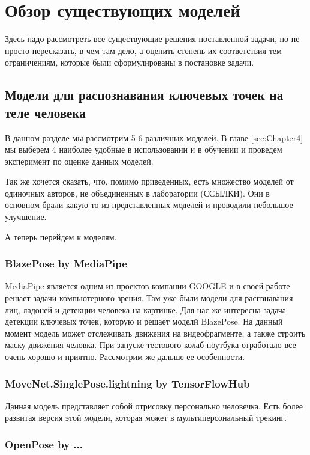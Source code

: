 \section{Обзор существующих моделей}
\label{sec:Chapter2} 
Здесь надо рассмотреть все существующие решения поставленной задачи, но не просто пересказать, в чем там дело, а оценить степень их соответствия тем ограничениям, которые были сформулированы в постановке задачи.


\subsection{Модели для распознавания ключевых точек на теле человека}

В данном разделе мы рассмотрим 5-6 различных моделей. В главе \ref{sec:Chapter4} мы выберем 4 наиболее удобные в использовании и в обучении и проведем эксперимент по оценке данных моделей.

Так же хочется сказать, что, помимо приведенных, есть множество моделей от одиночных авторов, не объединенных в лаборатории (ССЫЛКИ). Они в основном брали какую-то из представленных моделей и проводили небольшое улучшение.

А теперь перейдем к моделям.

\subsubsection{BlazePose by MediaPipe}

MediaPipe является одним из проектов компании GOOGLE и в своей работе решает задачи компьютерного зрения. Там уже были модели для распзнавания лиц, ладоней и детекции человека на картинке. Для нас же интересна задача детекции ключевых точек, которую и решает моделй BlazePose. На данный момент модель может отслеживать движения на видеофрагменте, а также строить маску движения человка. При запуске тестового колаб ноутбука отработало все очень хорошо и приятно. Рассмотрим же дальше ее особенности.

\subsubsection{MoveNet.SinglePose.lightning by TensorFlowHub}

Данная модель представляет собой отрисовку персонально человечка. Есть более развитая версия этой модели, которая может в мультиперсональный трекинг.

\subsubsection{OpenPose by ...}


